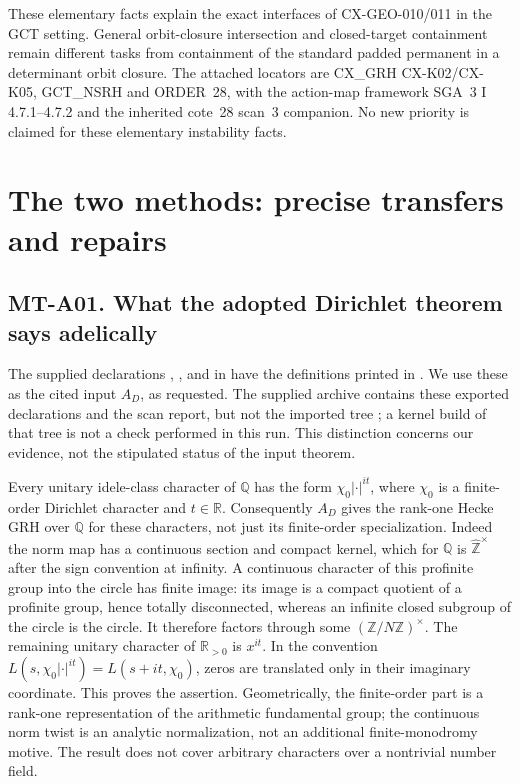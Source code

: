 \documentclass[11pt,a4paper]{article}
\begin{document}
These elementary facts explain the exact interfaces of
CX-GEO-010/011 in the GCT setting. General orbit-closure
intersection and closed-target containment remain different tasks
from containment of the standard padded permanent in a determinant
orbit closure. The attached locators are CX\_GRH CX-K02/CX-K05,
GCT\_NSRH and ORDER~28, with the action-map framework
SGA~3 I 4.7.1--4.7.2 and the inherited cote~28 scan~3 companion.
No new priority is claimed for these elementary instability facts.


\section{The two methods: precise transfers and repairs}
\label{sec:methods}

\subsection*{MT-A01. What the adopted Dirichlet theorem says adelically}
The supplied declarations ,
, and
 in  have the
definitions printed in .  We use these as the
cited input $A_D$, as requested.  The supplied archive contains these exported
declarations and the scan report, but not the imported tree
; a kernel build of that tree is
not a check performed in this run.  This distinction concerns our evidence,
not the stipulated status of the input theorem.

Every unitary idele-class character of $\mathbb Q$ has the form
$\chi_0|\cdot|^{it}$, where $\chi_0$ is a finite-order Dirichlet character
and $t\in\mathbb R$.  Consequently $A_D$ gives the rank-one Hecke GRH over
$\mathbb Q$ for these characters, not just its finite-order specialization.
Indeed the norm map has a continuous section and compact kernel, which for
$\mathbb Q$ is $\widehat{\mathbb Z}^{\times}$ after the sign convention at
infinity.  A continuous character of this profinite group into the circle has
finite image: its image is a compact quotient of a profinite group, hence
totally disconnected, whereas an infinite closed subgroup of the circle is
the circle.  It therefore factors through some
$(\mathbb Z/N\mathbb Z)^\times$.  The remaining unitary character of
$\mathbb R_{>0}$ is $x^{it}$.  In the convention
$L(s,\chi_0|\cdot|^{it})=L(s+it,\chi_0)$, zeros are translated only in
their imaginary coordinate.  This proves the assertion.  Geometrically,
the finite-order part is a rank-one representation of the arithmetic
fundamental group; the continuous norm twist is an analytic normalization,
not an additional finite-monodromy motive.  The result does not cover
arbitrary characters over a nontrivial number field.
\end{document}
